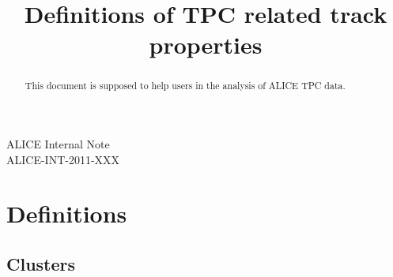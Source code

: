 \documentclass[12pt]{article}
\title{Definitions of TPC related track properties}
\author{}
\begin{document}
\begin{minipage}[20]{400pt}
\pagestyle{empty}
\begin{center}
ALICE Internal Note \\ ALICE-INT-2011-XXX
\maketitle
\begin{abstract}
This document is supposed to help users in the analysis of ALICE TPC data.
\end{abstract}
\end{center}
\end{minipage}

\setcounter{page}{1}

\section{Definitions}

\subsection{Clusters}
	
\end{document}
